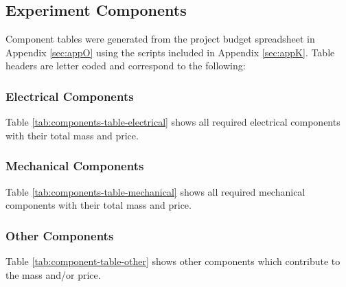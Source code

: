 \begin{landscape}
\subsection{Experiment Components} \label{components}
\label{sec:experiment-components}

Component tables were generated from the project budget spreadsheet in Appendix \ref{sec:appO} using the scripts included in Appendix \ref{sec:appK}. Table headers are letter coded and correspond to the following:

\subsubsection{Electrical Components}

Table \ref{tab:components-table-electrical} shows all required electrical components with their total mass and price.\\



\end{landscape}

\begin{landscape}

\subsubsection{Mechanical Components}

Table \ref{tab:components-table-mechanical} shows all required mechanical components with their total mass and price.\\




\raggedbottom
\end{landscape}

\begin{landscape}
\subsubsection{Other Components}
Table \ref{tab:component-table-other} shows other components which contribute to the mass and/or price.\\




\raggedbottom
\end{landscape}